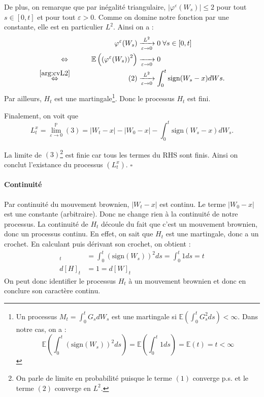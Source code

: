 \documentclass[openany]{book}
\makeatletter
\renewcommand{\P}{\mathds{P}}
\newcommand{\E}{\mathbb{E}}
\newcommand{\1}{\mathbbm{1}}
\newcommand{\sign}{\text{sign}}
\renewenvironment{proof}[1][\textbf{\textit{Démonstration}}]{%
  \par\pushQED{\qed}%
  \normalfont\topsep6\p@\@plus6\p@\relax
  \trivlist\item[\hskip\labelsep
    #1\@addpunct{.}]\ignorespaces
}{%
  \popQED\endtrivlist\@endpefalse
}
\theoremstyle{thmfont}
\theoremstyle{deffont}
\theoremstyle{thmfont}
\theoremstyle{deffont}
\makeatother
\begin{document}
\begin{proof}
\noindent De plus, on remarque que par inégalité triangulaire,
$|\varphi^\varepsilon(W_s)| \leq 2$ pour tout $s \in[0,t]$ et pour tout $\varepsilon > 0$. Comme on domine notre fonction par une constante, elle est en particulier $L^2$. Ainsi on a :
\begin{alignat*}{2}
&& \varphi^\varepsilon(W_s) &\xrightarrow[\varepsilon \to 0]{L^2} 0 \; \forall s \in [0,t]\\
\Leftrightarrow\;&&\qquad \E\left(\left(\varphi^\varepsilon(W_s)\right)^2\right) &\xrightarrow[\varepsilon\to0]{} 0\\
\overset{\eqref{arg:cvL2}}{\Leftrightarrow}&&\qquad(2) &\xrightarrow[\varepsilon \to 0]{L^2} \int_0^t \sign(W_s -x) dWs.
\end{alignat*}
Par ailleurs, $H_t$ est une martingale\footnote{Un processus $M_t = \int_0^t G_s dW_s$ est une martingale si $\E(\int_0^t G_s^2 ds)<\infty$. Dans notre cas, on a : $$\E\left(\int_0^t\left(\sign(W_s)\right)^2 ds\right) = \E\left(\int_0^t1 ds\right) = \E(t) = t < \infty$$}. Donc le processus $H_t$ est fini.

\noindent Finalement, on voit que
\begin{equation}
  L_t^x = \lim_{\varepsilon \to 0}^{\P}(3) = |W_t-x| - |W_0 - x| -  \int_0^t\sign(W_s -x)dW_s.
  \label{eq:exprTempsLoc}
\end{equation}

\noindent La limite de $(3)$\footnote{On parle de limite en probabilité puisque le terme $(1)$ converge p.s. et le terme $(2)$ converge en $L^2$.} est finie car tous les termes du RHS sont finis. Ainsi on conclut l'existance du processus $(L_t^x)$. \hfill $\square$

\paragraph{Continuité} Par continuité du mouvement brownien, $|W_t - x|$ est continu. Le terme $|W_0 - x|$ est une constante (arbitraire). Donc ne change rien à la continuité de notre processus. La continuité de $H_t$ découle du fait que c'est un mouvement brownien, donc un processus continu. En effet, on sait que $H_t$ est une martingale, donc a un crochet. En calculant puis dérivant son crochet, on obtient :
\begin{align*}
  [H]_t &= \int_0^t (\sign(W_s))^2 ds  = \int_0^t 1 ds = t\\
  d[H]_t &= 1 = d[W]_t
\end{align*}
On peut donc identifier le processus $H_t$ à un mouvement brownien et donc en conclure son caractère continu.  


\end{proof}
\end{document}
